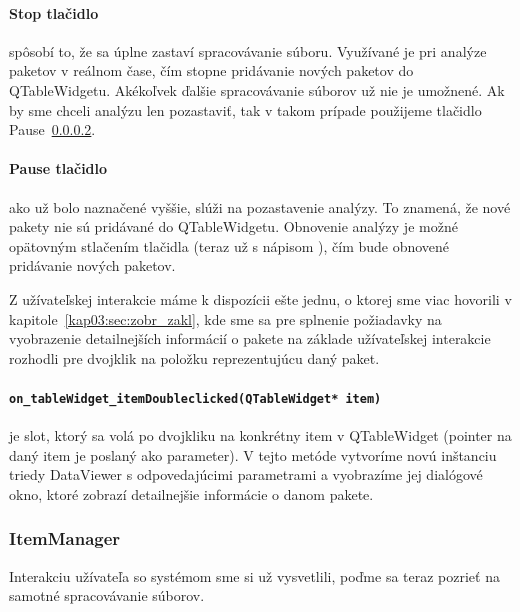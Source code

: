 \paragraph{Stop tlačidlo}

spôsobí to, že sa úplne zastaví spracovávanie súboru. Využívané je pri analýze paketov v reálnom čase, čím stopne pridávanie nových paketov do QTableWidgetu. Akékoľvek ďalšie spracovávanie súborov už nie je umožnené. Ak by sme chceli analýzu len pozastaviť, tak v takom prípade použijeme tlačidlo Pause~\ref{kap04:sec:pause_button}.

\paragraph{Pause tlačidlo}
\label{kap04:sec:pause_button}

ako už bolo naznačené vyššie, slúži na pozastavenie analýzy. To znamená, že nové pakety nie sú pridávané do QTableWidgetu. Obnovenie analýzy je možné opätovným stlačením tlačidla (teraz už s nápisom ), čím bude obnovené pridávanie nových paketov.

Z užívateľskej interakcie máme k dispozícii ešte jednu, o ktorej sme viac hovorili v kapitole~\ref{kap03:sec:zobr_zakl}, kde sme sa pre splnenie požiadavky na vyobrazenie detailnejších informácií o pakete na základe užívateľskej interakcie rozhodli pre dvojklik na položku reprezentujúcu daný paket.

\paragraph{\texttt{on\_tableWidget\_itemDoubleclicked(QTableWidget* item)}}

je slot, ktorý sa volá po dvojkliku na konkrétny item v QTableWidget (pointer na daný item je poslaný ako parameter). V tejto metóde vytvoríme novú inštanciu triedy DataViewer s odpovedajúcimi parametrami a vyobrazíme jej dialógové okno, ktoré zobrazí detailnejšie informácie o danom pakete.

\subsubsection{ItemManager}
Interakciu užívateľa so systémom sme si už vysvetlili, poďme sa teraz pozrieť na samotné spracovávanie súborov.

